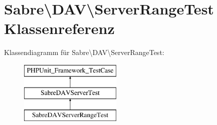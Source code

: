 \hypertarget{class_sabre_1_1_d_a_v_1_1_server_range_test}{}\section{Sabre\textbackslash{}D\+AV\textbackslash{}Server\+Range\+Test Klassenreferenz}
\label{class_sabre_1_1_d_a_v_1_1_server_range_test}
Klassendiagramm für Sabre\textbackslash{}D\+AV\textbackslash{}Server\+Range\+Test\+:\begin{figure}[H]
\begin{center}
\leavevmode
\includegraphics[height=3.000000cm]{class_sabre_1_1_d_a_v_1_1_server_range_test}
\end{center}
\end{figure}
